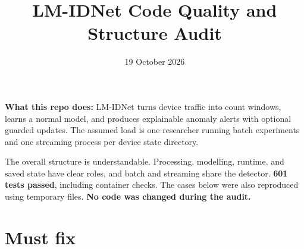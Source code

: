 \documentclass[11pt,a4paper]{article}
\title{\textbf{LM-IDNet Code Quality and Structure Audit}}
\author{}
\date{19 October 2026}
\begin{document}
\maketitle

\textbf{What this repo does:} LM-IDNet turns device traffic into count windows,
learns a normal model, and produces explainable anomaly alerts with optional
guarded updates. The assumed load is one researcher running batch experiments
and one streaming process per device state directory.

The overall structure is understandable. Processing, modelling, runtime, and
saved state have clear roles, and batch and streaming share the detector.
\textbf{601 tests passed}, including container checks. The cases below were also
reproduced using temporary files. \textbf{No code was changed during the audit.}

\section*{Must fix}
\end{document}
